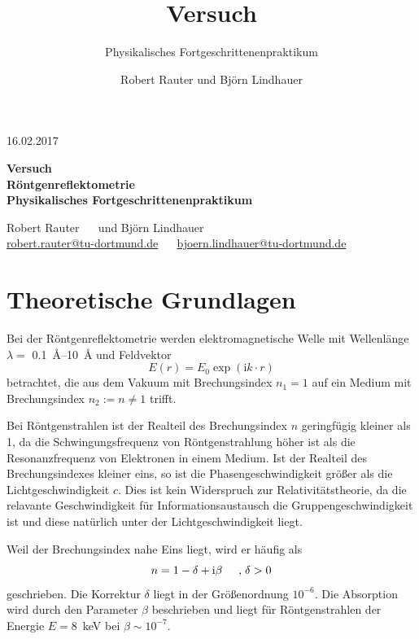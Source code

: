 \documentclass[captions=tableheading]{scrartcl}
\title{Versuch \versuchnummer\\ \versuchname}
\subtitle{Physikalisches Fortgeschrittenenpraktikum}
\author{Robert Rauter und Björn Lindhauer}
\date{\versuchdatum}
\newcommand{\versuchnummer}{}
\newcommand{\versuchname}{Röntgenreflektometrie}
\newcommand{\versuchdatum}{16.02.2017}
\newcommand{\im}{\mathrm{i}}
\begin{document}
\begin{titlepage}
{\large \versuchdatum}
\vspace{7cm}
\begin{center}
\textbf{\huge Versuch \versuchnummer}\\\vspace{0.5cm}
\textbf{\huge \versuchname}\\
\vspace{0.2cm}
\textbf{Physikalisches Fortgeschrittenenpraktikum}\\
\vspace{9cm}

{\Large Robert Rauter \ \ \hspace{1.5cm} und \hspace{1.5cm} Björn Lindhauer}\\
{ \url{robert.rauter@tu-dortmund.de} \ \ \hspace{2cm} \url{bjoern.lindhauer@tu-dortmund.de}}
\end{center}
\end{titlepage}

\section{Theoretische Grundlagen}
Bei der Röntgenreflektometrie werden elektromagnetische Welle mit Wellenlänge $\lambda=$ \SIrange{0.1}{10}{\angstrom} und Feldvektor 
\begin{equation}
E\left(r\right)=E_0 \exp\left(\im  k\cdot r \right)
\end{equation}
betrachtet, die aus dem Vakuum mit Brechungsindex $n_1=1$ auf ein Medium mit Brechungsindex $n_2:=n \neq 1$ trifft.

Bei Röntgenstrahlen ist der Realteil des Brechungsindex $n$ geringfügig kleiner als 1, da die Schwingungsfrequenz von Röntgenstrahlung höher ist als die Resonanzfrequenz von Elektronen in einem Medium.
Ist der Realteil des Brechungsindexes kleiner eins, so ist die Phasengeschwindigkeit größer als die Lichtgeschwindigkeit $c$.
Dies ist kein Widerspruch zur Relativitätstheorie, da die relavante Geschwindigkeit für Informationsaustausch die Gruppengeschwindigkeit ist und diese natürlich unter der Lichtgeschwindigkeit liegt.

Weil der Brechungsindex nahe Eins liegt, wird er häufig als
\begin{equation}
n=1-\delta + \im\beta \hspace{0.5cm}\text{,}\hspace{0.1cm} \delta >0
\end{equation}
geschrieben. 
Die Korrektur $\delta$ liegt in der Größenordnung $10^{-6}$. 
Die Absorption wird durch den Parameter $\beta$ beschrieben und liegt für Röntgenstrahlen der Energie $E=$\SI{8}{\kilo\eV} bei $\beta \sim 10^{-7}$.
\end{document}
